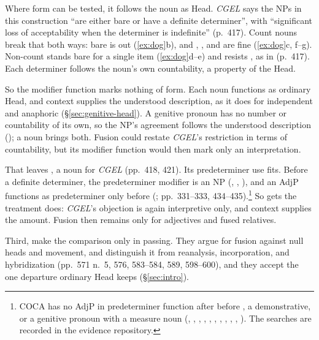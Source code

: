 \documentclass[12pt]{article}
\begin{document}
Where form can be tested, it follows the noun as Head. \textit{CGEL} says the NPs in this construction \enquote{are either bare or have a definite determiner}, with \enquote{significant loss of acceptability when the determiner is indefinite} (p.~417). Count nouns break that both ways: bare  is out (\ref{ex:dog}b), and , , and  are fine (\ref{ex:dog}c, f--g). Non-count  stands bare for a single item (\ref{ex:dog}d--e) and resists , as in  (p.~417). Each determiner follows the noun's own countability, a property of the Head.

So the modifier function marks nothing of form. Each noun functions as ordinary Head, and context supplies the understood description, as it does for independent  and anaphoric  (§\ref{sec:genitive-head}). A genitive pronoun has no number or countability of its own, so the NP's agreement follows the understood description (); a noun brings both. Fusion could restate \textit{CGEL}'s restriction in terms of countability, but its modifier function would then mark only an interpretation.

That leaves , a noun for \textit{CGEL} (pp.~418, 421). Its predeterminer use fits. Before a definite determiner, the predeterminer modifier is an NP (, , ), and an AdjP functions as predeterminer only before  (; pp.~331--333, 434--435).\footnote{COCA has no AdjP in predeterminer function after  before , a demonstrative, or a genitive pronoun with a measure noun (, , , , , , , , , , ). The searches are recorded in the evidence repository.} So  gets the treatment  does: \textit{CGEL}'s objection is again interpretive only, and context supplies the amount. Fusion then remains only for adjectives and fused relatives.

Third, \textcite{Payne2007} make the comparison only in passing. They argue for fusion against null heads and movement, and distinguish it from reanalysis, incorporation, and hybridization (pp.~571 n.~5, 576, 583--584, 589, 598--600), and they accept the one departure ordinary Head keeps (§\ref{sec:intro}).
\end{document}
